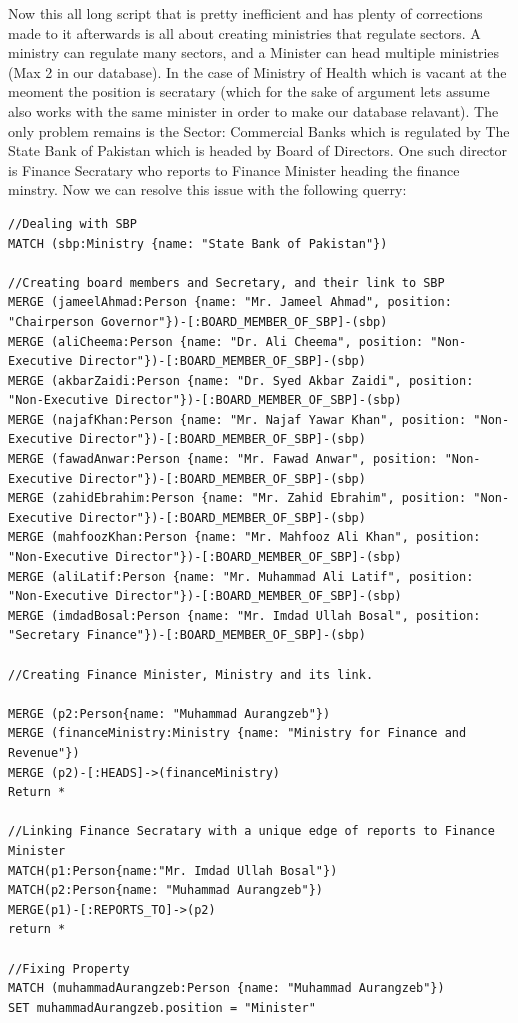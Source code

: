 \documentclass[12pt]{article}
\begin{document}
Now this all long script that is pretty inefficient and has plenty of corrections made to it afterwards is all about creating ministries that regulate sectors. A ministry can regulate many sectors, and a Minister can head multiple ministries (Max 2 in our database). In the case of Ministry of Health which is vacant at the meoment the position is secratary (which for the sake of argument lets assume also works with the same minister in order to make our database relavant). The only problem remains is the Sector: Commercial Banks which is regulated by The State Bank of Pakistan which is headed by Board of Directors. One such director is Finance Secratary who reports to Finance Minister heading the finance minstry. Now we can resolve this issue with the following querry:

\begin{lstlisting}[frame=single]
    //Dealing with SBP
MATCH (sbp:Ministry {name: "State Bank of Pakistan"})

//Creating board members and Secretary, and their link to SBP
MERGE (jameelAhmad:Person {name: "Mr. Jameel Ahmad", position: "Chairperson Governor"})-[:BOARD_MEMBER_OF_SBP]-(sbp)
MERGE (aliCheema:Person {name: "Dr. Ali Cheema", position: "Non-Executive Director"})-[:BOARD_MEMBER_OF_SBP]-(sbp)
MERGE (akbarZaidi:Person {name: "Dr. Syed Akbar Zaidi", position: "Non-Executive Director"})-[:BOARD_MEMBER_OF_SBP]-(sbp)
MERGE (najafKhan:Person {name: "Mr. Najaf Yawar Khan", position: "Non-Executive Director"})-[:BOARD_MEMBER_OF_SBP]-(sbp)
MERGE (fawadAnwar:Person {name: "Mr. Fawad Anwar", position: "Non-Executive Director"})-[:BOARD_MEMBER_OF_SBP]-(sbp)
MERGE (zahidEbrahim:Person {name: "Mr. Zahid Ebrahim", position: "Non-Executive Director"})-[:BOARD_MEMBER_OF_SBP]-(sbp)
MERGE (mahfoozKhan:Person {name: "Mr. Mahfooz Ali Khan", position: "Non-Executive Director"})-[:BOARD_MEMBER_OF_SBP]-(sbp)
MERGE (aliLatif:Person {name: "Mr. Muhammad Ali Latif", position: "Non-Executive Director"})-[:BOARD_MEMBER_OF_SBP]-(sbp)
MERGE (imdadBosal:Person {name: "Mr. Imdad Ullah Bosal", position: "Secretary Finance"})-[:BOARD_MEMBER_OF_SBP]-(sbp)

//Creating Finance Minister, Ministry and its link.

MERGE (p2:Person{name: "Muhammad Aurangzeb"})
MERGE (financeMinistry:Ministry {name: "Ministry for Finance and Revenue"})
MERGE (p2)-[:HEADS]->(financeMinistry)
Return *

//Linking Finance Secratary with a unique edge of reports to Finance Minister
MATCH(p1:Person{name:"Mr. Imdad Ullah Bosal"})
MATCH(p2:Person{name: "Muhammad Aurangzeb"})
MERGE(p1)-[:REPORTS_TO]->(p2)
return *

//Fixing Property
MATCH (muhammadAurangzeb:Person {name: "Muhammad Aurangzeb"})
SET muhammadAurangzeb.position = "Minister"
\end{lstlisting}
\end{document}
